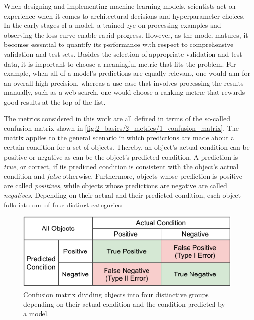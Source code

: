 When designing and implementing machine learning models, scientists act on experience when it comes to architectural decisions and hyperparameter choices. In the early stages of a model, a trained eye on processing examples and observing the loss curve enable rapid progress. However, as the model matures, it becomes essential to quantify its performance with respect to comprehensive validation and test sets. Besides the selection of appropriate validation and test data, it is important to choose a meaningful metric that fits the problem. For example, when all of a model's predictions are equally relevant, one would aim for an overall high precision, whereas a use case that involves processing the results manually, such as a web search, one would choose a ranking metric that rewards good results at the top of the list.

The metrics considered in this work are all defined in terms of the so-called confusion matrix shown in \autoref{fig:2_basics/2_metrics/1_confusion_matrix}. The matrix applies to the general scenario in which predictions are made about a certain condition for a set of objects. Thereby, an object's actual condition can be positive or negative as can be the object's predicted condition. A prediction is \emph{true}, or correct, if its predicted condition is consistent with the object's actual condition and \emph{false} otherwise. Furthermore, objects whose prediction is positive are called \emph{positives}, while objects whose predictions are negative are called \emph{negatives}. Depending on their actual and their predicted condition, each object falls into one of four distinct categories:

\begin{figure}[t]
    \centering
    \includegraphics{2_basics/2_metrics/confusion_matrix}
    \caption{Confusion matrix dividing objects into four distinctive groups depending on their actual condition and the condition predicted by a model.}
    \label{fig:2_basics/2_metrics/1_confusion_matrix}
\end{figure}

